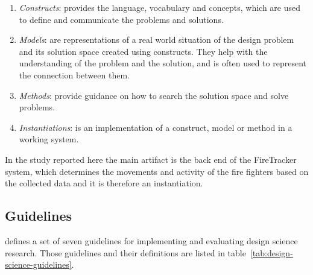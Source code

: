 \documentclass[../Main/thesis.tex]{subfiles}
\begin{document}
\begin{enumerate}
	\item \textit{Constructs}: provides the language, vocabulary and concepts, which are used to define and communicate the problems and solutions.
	\item \textit{Models}: are representations of a real world situation of the design problem and its solution space created using constructs. They help with the understanding of the problem and the solution, and is often used to represent the connection between them. 
	\item \textit{Methods}: provide guidance on how to search the solution space and solve problems.
	\item \textit{Instantiations}: is an implementation of a construct, model or method in a working system.
\end{enumerate}

In the study reported here the main artifact is the back end of the FireTracker system, which determines the movements and activity of the fire fighters based on the collected data and it is therefore an instantiation.

\subsection{Guidelines}
\citet{hevner2004design} defines a set of seven guidelines for implementing and evaluating design science research.
Those guidelines and their definitions are listed in table~\ref{tab:design-science-guidelines}.
\end{document}
